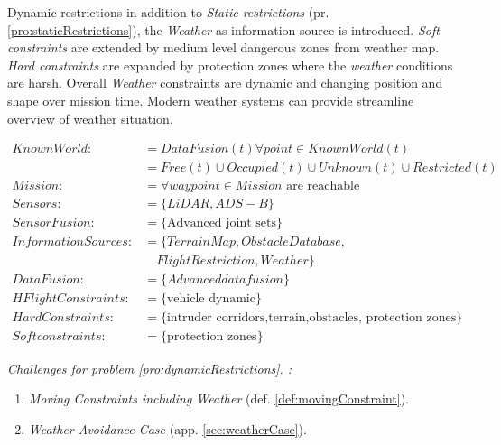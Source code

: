 \begin{problem}{Dynamic restrictions}\label{pro:dynamicRestrictions}
    in addition to \emph{Static restrictions} (pr. \ref{pro:staticRestrictions}), the \emph{Weather} as information source is introduced. \emph{Soft constraints} are extended by medium level dangerous zones from weather map. \emph{Hard constraints} are expanded by protection zones where the \emph{weather} conditions are harsh. Overall \emph{Weather} constraints are dynamic and changing position and shape over mission time. Modern weather systems can provide streamline overview of weather situation. 
    
    \begin{equation}\label{eq:dynamicRestrictionsProblemDefinition}
        \begin{aligned}
            KnownWorld:&= DataFusion(t)\forall point\in KnownWorld(t)\\
                       &=Free(t) \cup Occupied(t) \cup Unknown(t) \cup Restricted(t)\\
            Mission:&= \forall waypoint\in Mission \text{ are reachable}\\
            Sensors:&= \{LiDAR,ADS-B\}\\
            SensorFusion:&= \{\text{Advanced joint sets}\}\\
            InformationSources:&=\{Terrain Map,Obstacle Database,\\
                               &\quad Flight Restriction,Weather\}\\
            DataFusion:&= \{Advanced data fusion\}\\
            HFlightConstraints:&=\{\text{vehicle dynamic}\}\\
            HardConstraints:&=\{\text{intruder corridors,terrain,obstacles, protection zones}\}\\
            Softconstraints:&=\{\text{protection zones}\}
        \end{aligned}
    \end{equation}
    
    \noindent \emph{Challenges for problem  \ref{pro:dynamicRestrictions}. :}
    \begin{enumerate}
        \item\emph{Moving Constraints including Weather} (def. \ref{def:movingConstraint}).
        \item\emph{Weather Avoidance Case} (app. \ref{sec:weatherCase}).
    \end{enumerate}
\end{problem}


